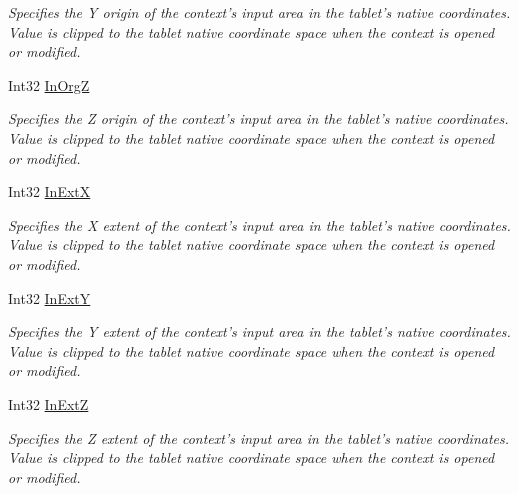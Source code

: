 \begin{DoxyCompactItemize}
\begin{DoxyCompactList}\small\item\em Specifies the Y origin of the context's input area in the tablet's native coordinates. Value is clipped to the tablet native coordinate space when the context is opened or modified. \item\end{DoxyCompactList}\item 
Int32 \hyperlink{class_wintab_d_n_1_1_c_wintab_context_a8ea45c9e123a684c7fc6141f9709a03d}{InOrgZ}
\begin{DoxyCompactList}\small\item\em Specifies the Z origin of the context's input area in the tablet's native coordinates. Value is clipped to the tablet native coordinate space when the context is opened or modified. \item\end{DoxyCompactList}\item 
Int32 \hyperlink{class_wintab_d_n_1_1_c_wintab_context_a4617fa32c1cfde4a434adb410d5fa20f}{InExtX}
\begin{DoxyCompactList}\small\item\em Specifies the X extent of the context's input area in the tablet's native coordinates. Value is clipped to the tablet native coordinate space when the context is opened or modified. \item\end{DoxyCompactList}\item 
Int32 \hyperlink{class_wintab_d_n_1_1_c_wintab_context_a98483a97a67cf1c9ddf42ba0d3344830}{InExtY}
\begin{DoxyCompactList}\small\item\em Specifies the Y extent of the context's input area in the tablet's native coordinates. Value is clipped to the tablet native coordinate space when the context is opened or modified. \item\end{DoxyCompactList}\item 
Int32 \hyperlink{class_wintab_d_n_1_1_c_wintab_context_a69434687517c9e50421ea2be7dcb7c7e}{InExtZ}
\begin{DoxyCompactList}\small\item\em Specifies the Z extent of the context's input area in the tablet's native coordinates. Value is clipped to the tablet native coordinate space when the context is opened or modified. \item\end{DoxyCompactList}\item 

\end{DoxyCompactItemize}
